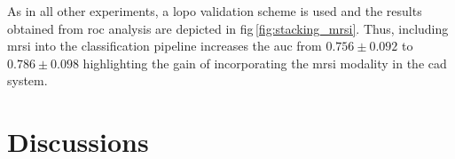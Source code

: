 \documentclass[final,3p,times,twocolumn]{elsarticle}
\begin{document}
As in all other experiments, a \ac{lopo} validation scheme is used and the
results obtained from \ac{roc} analysis are depicted in
\acs{fig}\,\ref{fig:stacking_mrsi}. Thus, including \ac{mrsi} into the
classification pipeline increases the \ac{auc} from $0.756 \pm 0.092$ to $0.786
\pm 0.098$ highlighting the gain of incorporating the \ac{mrsi} modality in the
\ac{cad} system.

\section{Discussions}\label{sec:conclusion}



 

\end{document}
